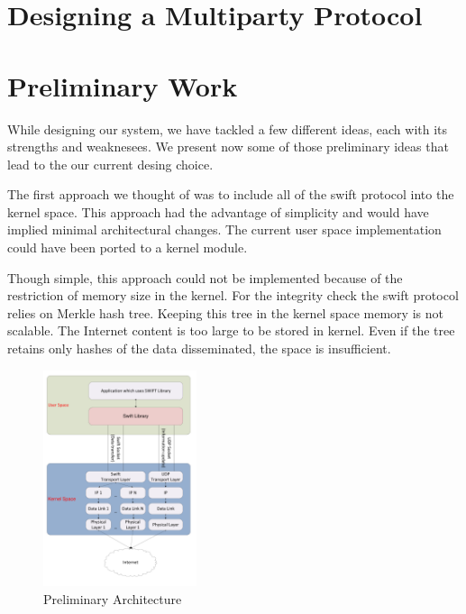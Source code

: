 
\section{Designing a Multiparty Protocol}
\label{sec:multiparty:design}


\section{Preliminary Work}
\label{sec:multiparty:preliminary-work}

While designing our system, we have tackled a few different ideas, each with
its strengths and weaknesees. We present now some of those preliminary ideas
that lead to the our current desing choice.

The first approach we thought of was to include all of the swift protocol into
the kernel space. This approach had the advantage of simplicity and would have
implied minimal architectural changes. The current user space implementation
could have been ported to a kernel module.

Though simple, this approach could not be implemented because of the
restriction of memory size in the kernel.  For the integrity check the swift
protocol relies on Merkle hash tree. Keeping this tree in the kernel space
memory is not scalable. The Internet content is too large to be stored in
kernel. Even if the tree retains only hashes of the data disseminated, the
space is insufficient.

\begin{figure}
  \centering
  \includegraphics[width=0.4\textwidth]{src/img/multiparty/preliminary-architecture}
  \caption{Preliminary Architecture}
  \label{fig:multiparty:preliminary-architecture}
\end{figure}

